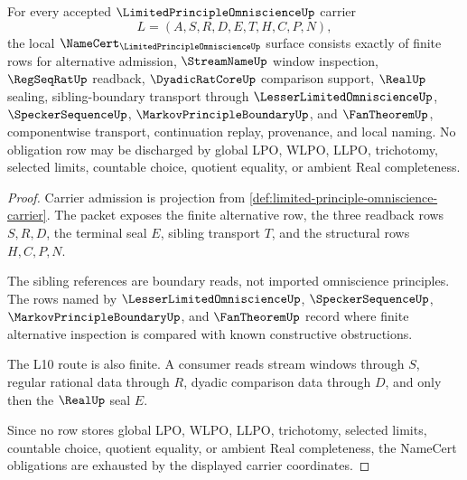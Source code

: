 \begin{theorem}
\label{thm:limited-principle-omniscience-namecert-obligations}
For every accepted $\LimitedPrincipleOmniscienceUp$ carrier
$$
L=(A,S,R,D,E,T,H,C,P,N),
$$
the local $\NameCert_{\LimitedPrincipleOmniscienceUp}$ surface consists exactly of finite rows for alternative admission, $\StreamNameUp$ window inspection, $\RegSeqRatUp$ readback, $\DyadicRatCoreUp$ comparison support, $\RealUp$ sealing, sibling-boundary transport through $\LesserLimitedOmniscienceUp$, $\SpeckerSequenceUp$, $\MarkovPrincipleBoundaryUp$, and $\FanTheoremUp$, componentwise transport, continuation replay, provenance, and local naming. No obligation row may be discharged by global LPO, WLPO, LLPO, trichotomy, selected limits, countable choice, quotient equality, or ambient Real completeness.
\end{theorem}
\begin{proof}
Carrier admission is projection from \autoref{def:limited-principle-omniscience-carrier}. The packet exposes the finite alternative row, the three readback rows $S,R,D$, the terminal seal $E$, sibling transport $T$, and the structural rows $H,C,P,N$.

The sibling references are boundary reads, not imported omniscience principles. The rows named by $\LesserLimitedOmniscienceUp$, $\SpeckerSequenceUp$, $\MarkovPrincipleBoundaryUp$, and $\FanTheoremUp$ record where finite alternative inspection is compared with known constructive obstructions.

The L10 route is also finite. A consumer reads stream windows through $S$, regular rational data through $R$, dyadic comparison data through $D$, and only then the $\RealUp$ seal $E$.

Since no row stores global LPO, WLPO, LLPO, trichotomy, selected limits, countable choice, quotient equality, or ambient Real completeness, the NameCert obligations are exhausted by the displayed carrier coordinates.
\end{proof}


